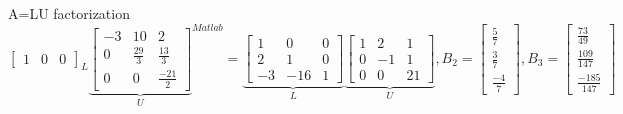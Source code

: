 \documentclass[aspectratio=169,notes]{beamer}
\begin{document}
\begin{frame}[t]{A=LU factorization}
{{\begin{equation*}
{{\begin{bmatrix}
                            1            & 0             & 0
                        \end{bmatrix}}_{L}\underbrace{\begin{bmatrix}
                            -3 & 10           & 2             \\
                            0  & \frac{29}{3} & \frac{13}{3}  \\
                            0  & 0            & \frac{-21}{2}
                        \end{bmatrix}}_{U}}^{Matlab}=\underbrace{\begin{bmatrix}
                        1  & 0   & 0 \\
                        2  & 1   & 0 \\
                        -3 & -16 & 1
                    \end{bmatrix}}_{L}\underbrace{\begin{bmatrix}
                        1 & 2  & 1  \\
                        0 & -1 & 1  \\
                        0 & 0  & 21
                    \end{bmatrix}}_{U},B_2=\begin{bmatrix}
                    \frac{5}{7} \\ \frac{3}{7} \\ \frac{-4}{7}
                \end{bmatrix},B_3=\begin{bmatrix}
                    \frac{73}{49} \\ \frac{109}{147} \\
                    \frac{-185}{147}
                \end{bmatrix}
            \end{equation*}}}
\end{frame}
\end{document}
